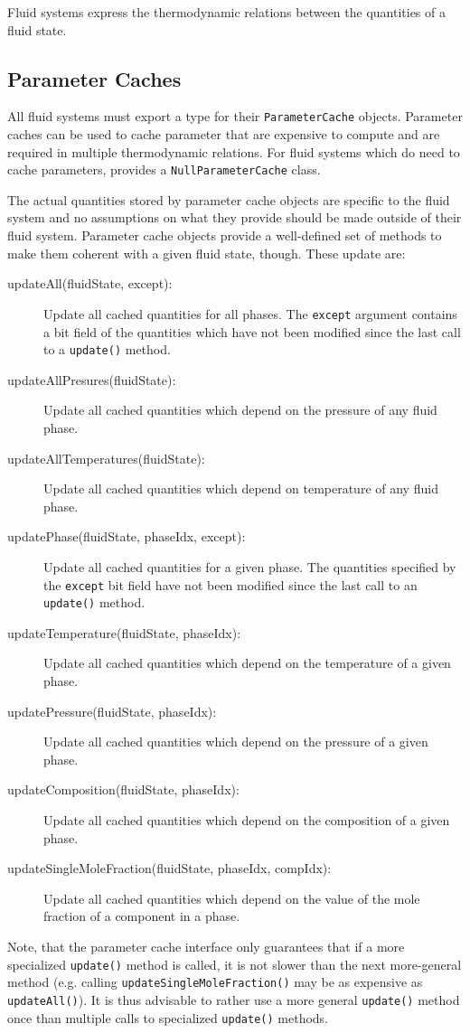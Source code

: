 Fluid systems express the thermodynamic relations between the
quantities of a fluid state.

\subsection{Parameter Caches}

All fluid systems must export a type for their \texttt{ParameterCache}
objects. Parameter caches can be used to cache parameter that are
expensive to compute and are required in multiple thermodynamic
relations. For fluid systems which do need to cache parameters,
\eWoms provides a \texttt{NullParameterCache} class.

The actual quantities stored by parameter cache objects are specific
to the fluid system and no assumptions on what they provide should be
made outside of their fluid system. Parameter cache objects provide a
well-defined set of methods to make them coherent with a given fluid
state, though. These update are:
\begin{description}
\item[updateAll(fluidState, except):] Update all cached quantities for
  all phases. The \texttt{except} argument contains a bit field of the
  quantities which have not been modified since the last call to a
  \texttt{update()} method.
\item[updateAllPresures(fluidState):] Update all cached quantities
  which depend on the pressure of any fluid phase.
\item[updateAllTemperatures(fluidState):] Update all cached quantities
  which depend on temperature of any fluid phase.
\item[updatePhase(fluidState, phaseIdx, except):] Update all cached
  quantities for a given phase. The quantities specified by the
  \texttt{except} bit field have not been modified since the last call
  to an \texttt{update()} method.
\item[updateTemperature(fluidState, phaseIdx):] Update all cached
  quantities which depend on the temperature of a given phase.
\item[updatePressure(fluidState, phaseIdx):] Update all cached
  quantities which depend on the pressure of a given phase.
\item[updateComposition(fluidState, phaseIdx):] Update all cached
  quantities which depend on the composition of a given phase.
\item[updateSingleMoleFraction(fluidState, phaseIdx, compIdx):] Update
  all cached quantities which depend on the value of the mole fraction
  of a component in a phase.
\end{description}
Note, that the parameter cache interface only guarantees that if a
more specialized \texttt{update()} method is called, it is not slower
than the next more-general method (e.g. calling
\texttt{updateSingleMoleFraction()} may be as expensive as
\texttt{updateAll()}). It is thus advisable to rather use a more
general \texttt{update()} method once than multiple calls to
specialized \texttt{update()} methods.

